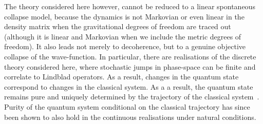 \documentclass[aps,pra,showpacs,citeautoscript,amsmath,amssymb,floatfix,superscriptaddress,bbm, verbatim,amsfonts,changes,12pt,nofootinbib,longbibliography]{revtex4-2}
\begin{document}
The theory considered here however, cannot be reduced to a linear spontaneous collapse model, because the dynamics is not Markovian or even linear in the density matrix when the gravitational degrees of freedom are traced out (although it is linear and Markovian when we include the metric degrees of freedom). It also leads not merely to decoherence, but
to a genuine objective collapse of the wave-function.
In particular, there are realisations of the discrete theory considered here, where stochastic jumps in phase-space can be finite and correlate to Lindblad operators. As a result, changes in the quantum state correspond to changes in the classical system. As a a result, the quantum state remains pure and uniquely determined by the trajectory of the classical system~\cite{UCLqubit}. Purity of the quantum system conditional on the classical trajectory has since been shown to also hold in the continuous realisations under natural conditions\cite{layton2022semi}. 
\end{document}
